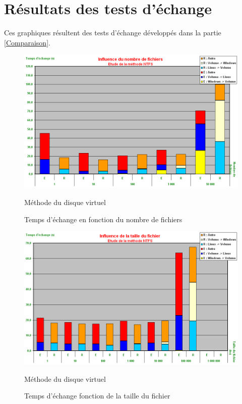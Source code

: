 
\section{Résultats des tests d'échange}

Ces graphiques résultent des tests d'échange développés dans la partie \ref{Comparaison}.
\\


\begin{figure}[!h]
	\center
	\includegraphics[scale=0.4]{img/tests/nombre_NTFS.png}
	\caption{Temps d'échange en fonction du nombre de fichiers}
	Méthode du disque virtuel
\end{figure}

\begin{figure}[!h]
	\center
	\includegraphics[scale=0.4]{img/tests/taille_NTFS.png}
	\caption{Temps d'échange fonction de la taille du fichier}
	Méthode du disque virtuel
\end{figure}

